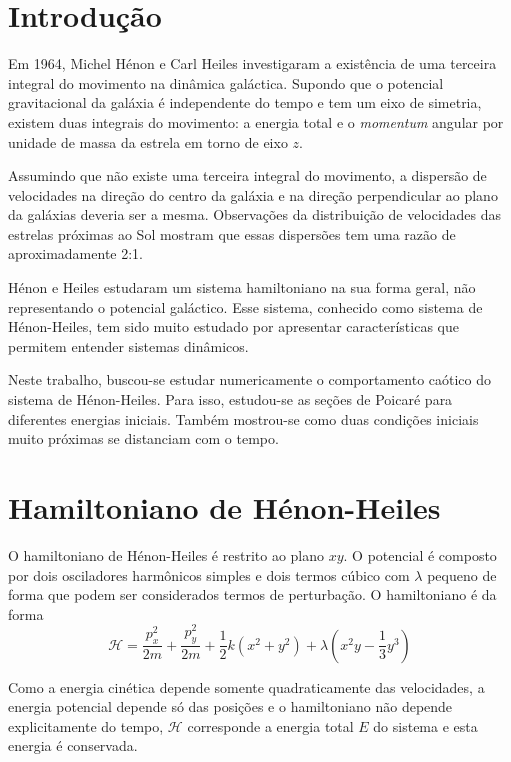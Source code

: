 \documentclass[brazilian, 10pt, a4paper, final]{article}
\begin{document}
\begin{multicols*}{2}
\section{Introdução}
Em 1964, Michel Hénon e Carl Heiles investigaram a existência de uma terceira integral do movimento na dinâmica galáctica. Supondo que o potencial gravitacional da galáxia é independente do tempo e tem um eixo de simetria, existem duas integrais do movimento: a energia total e o {\em momentum} angular por unidade de massa da estrela em torno de eixo $z$.


Assumindo que não existe uma terceira integral do movimento, a dispersão de velocidades na direção do centro da galáxia e na direção perpendicular ao plano da galáxias deveria ser a mesma. Observações da distribuição de velocidades das estrelas próximas ao Sol mostram que essas dispersões tem uma razão de aproximadamente 2:1.

Hénon e Heiles estudaram um sistema hamiltoniano na sua forma geral, não representando o potencial galáctico. Esse sistema, conhecido como sistema de Hénon-Heiles, tem sido muito estudado por apresentar características que permitem entender sistemas dinâmicos.

Neste trabalho, buscou-se estudar numericamente o comportamento caótico do sistema de Hénon-Heiles. Para isso, estudou-se as seções de Poicaré para diferentes energias iniciais. Também mostrou-se como duas condições iniciais muito próximas se distanciam com o tempo.

\section{Hamiltoniano de Hénon-Heiles}

O hamiltoniano de Hénon-Heiles é restrito ao plano $xy$. O potencial é composto por dois osciladores harmônicos simples e dois termos cúbico com $\lambda$ pequeno de forma que podem ser considerados termos de perturbação. O hamiltoniano é da forma
\begin{equation}\label{eq:hamiltonian}
  \mathcal{H}=\frac{p_x^2}{2m}+\frac{p_y^2}{2m}+\frac{1}{2}k(x^2+y^2)+\lambda\left(x^2y-\frac{1}{3}y^3\right)
\end{equation}

Como a energia cinética depende somente quadraticamente das velocidades, a energia potencial depende só das posições e o hamiltoniano não depende explicitamente do tempo, $\mathcal{H}$ corresponde a energia total $E$  do sistema e esta energia é conservada.


\end{multicols*}
\end{document}
